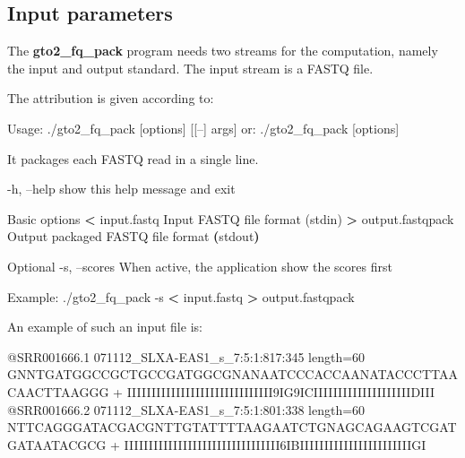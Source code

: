 \documentclass[11pt,]{krantz}
\newenvironment{Shaded}{\begin{snugshade}}{\end{snugshade}}
\newcommand{\KeywordTok}[1]{\textcolor[rgb]{0.27,0.27,0.27}{\textbf{#1}}}
\newcommand{\OperatorTok}[1]{\textcolor[rgb]{0.43,0.43,0.43}{\textbf{#1}}}
\newcommand{\ExtensionTok}[1]{#1}
\newcommand{\NormalTok}[1]{#1}
\begin{document}
\subsection*{Input parameters}\label{input-parameters-12}


The \textbf{gto2\_fq\_pack} program needs two streams for the
computation, namely the input and output standard. The input stream is a
FASTQ file.

The attribution is given according to:

\begin{Shaded}
\begin{Highlighting}[]
\ExtensionTok{Usage}\NormalTok{: ./gto2_fq_pack [options] [[--] args]}
   \ExtensionTok{or}\NormalTok{: ./gto2_fq_pack [options]}

\ExtensionTok{It}\NormalTok{ packages each FASTQ read in a single line.}

    \ExtensionTok{-h}\NormalTok{, --help            show this help message and exit}

\ExtensionTok{Basic}\NormalTok{ options}
    \OperatorTok{<} \ExtensionTok{input.fastq}\NormalTok{         Input FASTQ file format (stdin)}
    \OperatorTok{>} \ExtensionTok{output.fastqpack}\NormalTok{    Output packaged FASTQ file format }
                          \KeywordTok{(}\ExtensionTok{stdout}\KeywordTok{)}

\ExtensionTok{Optional}
    \ExtensionTok{-s}\NormalTok{, --scores          When active, the application show }
                          \ExtensionTok{the}\NormalTok{ scores first}

\ExtensionTok{Example}\NormalTok{: ./gto2_fq_pack -s }\OperatorTok{<}\NormalTok{ input.fastq }\OperatorTok{>}\NormalTok{ output.fastqpack}
\end{Highlighting}
\end{Shaded}

An example of such an input file is:

\begin{Shaded}
\begin{Highlighting}[]
\ExtensionTok{@SRR001666.1}\NormalTok{ 071112_SLXA-EAS1_s_7:5:1:817:345 length=60}
\ExtensionTok{GNNTGATGGCCGCTGCCGATGGCGNANAATCCCACCAANATACCCTTAACAACTTAAGGG}
\ExtensionTok{+}
\ExtensionTok{IIIIIIIIIIIIIIIIIIIIIIIIIIIIII9IG9ICIIIIIIIIIIIIIIIIIIIIDIII}
\ExtensionTok{@SRR001666.2}\NormalTok{ 071112_SLXA-EAS1_s_7:5:1:801:338 length=60}
\ExtensionTok{NTTCAGGGATACGACGNTTGTATTTTAAGAATCTGNAGCAGAAGTCGATGATAATACGCG}
\ExtensionTok{+}
\ExtensionTok{IIIIIIIIIIIIIIIIIIIIIIIIIIIIIIII6IBIIIIIIIIIIIIIIIIIIIIIIIGI}
\end{Highlighting}
\end{Shaded}
\end{document}
